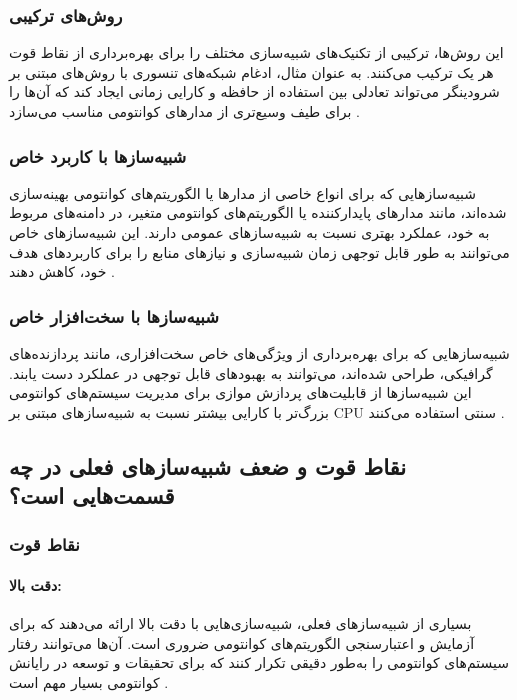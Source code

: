\subsubsection{روش‌های ترکیبی}
این روش‌ها، ترکیبی از تکنیک‌های شبیه‌سازی مختلف را برای بهره‌برداری از نقاط قوت هر یک ترکیب می‌کنند. به عنوان مثال، ادغام شبکه‌های تنسوری با روش‌های مبتنی بر شرودینگر می‌تواند تعادلی بین استفاده از حافظه و کارایی زمانی ایجاد کند که آن‌ها را برای طیف وسیع‌تری از مدارهای کوانتومی مناسب می‌سازد \cite{young_simulating_2023}.
\subsubsection{شبیه‌سازها با کاربرد خاص}
شبیه‌سازهایی که برای انواع خاصی از مدارها یا الگوریتم‌های کوانتومی بهینه‌سازی شده‌اند، مانند مدارهای پایدارکننده یا الگوریتم‌های کوانتومی متغیر، در دامنه‌های مربوط به خود، عملکرد بهتری نسبت به شبیه‌سازهای عمومی دارند. این شبیه‌سازهای خاص می‌توانند به طور قابل توجهی زمان شبیه‌سازی و نیازهای منابع را برای کاربردهای هدف خود، کاهش دهند \cite{young_simulating_2023}.
\subsubsection{شبیه‌سازها با سخت‌افزار خاص}
شبیه‌سازهایی که برای بهره‌برداری از ویژگی‌های خاص سخت‌افزاری، مانند پردازنده‌های گرافیکی، طراحی شده‌اند، می‌توانند به بهبودهای قابل توجهی در عملکرد دست یابند. این شبیه‌سازها از قابلیت‌های پردازش موازی برای مدیریت سیستم‌های کوانتومی بزرگ‌تر با کارایی بیشتر نسبت به شبیه‌سازهای مبتنی بر CPU سنتی استفاده می‌کنند \cite{young_simulating_2023, xu_herculean_2023}.


\subsection*{نقاط قوت و ضعف شبیه‌سازهای فعلی در چه قسمت‌هایی است؟}
\subsubsection{نقاط قوت}
\paragraph{دقت بالا:}
بسیاری از شبیه‌سازهای فعلی، شبیه‌سازی‌هایی با دقت بالا ارائه می‌دهند که برای آزمایش و اعتبارسنجی الگوریتم‌های کوانتومی ضروری است. آن‌ها می‌توانند رفتار سیستم‌های کوانتومی را به‌طور دقیقی تکرار کنند که برای تحقیقات و توسعه در رایانش کوانتومی بسیار مهم است \cite{young_simulating_2023}.
